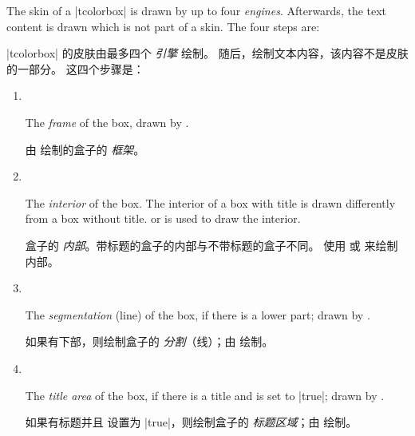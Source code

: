 The skin of a |tcolorbox| is drawn by up to four \emph{engines}.
Afterwards, the text content is drawn which is not part of a skin.
The four steps are:

|tcolorbox| 的皮肤由最多四个 \emph{引擎} 绘制。 随后，绘制文本内容，该内容不是皮肤的一部分。 这四个步骤是：


\begin{enumerate}
\item 
~\vspace*{-1em}

The \emph{frame} of the box, drawn by .

由  绘制的盒子的 \emph{框架}。


\item 
~\vspace*{-1em}

The \emph{interior} of the box. 
The interior of a box with title is   drawn differently from a box without title.
 or    is used to draw the interior.

盒子的 \emph{内部}。带标题的盒子的内部与不带标题的盒子不同。 使用  或  来绘制内部。


\item 
~\vspace*{-1em}

The \emph{segmentation} (line) of the box, if there is a lower part;
drawn by .

如果有下部，则绘制盒子的 \emph{分割}（线）；由  绘制。


\item 
~\vspace*{-1em}

The \emph{title area} of the box, if there is a title and
 is set to |true|; drawn
by .

如果有标题并且  设置为 |true|，则绘制盒子的 \emph{标题区域}；由  绘制。

\end{enumerate}

